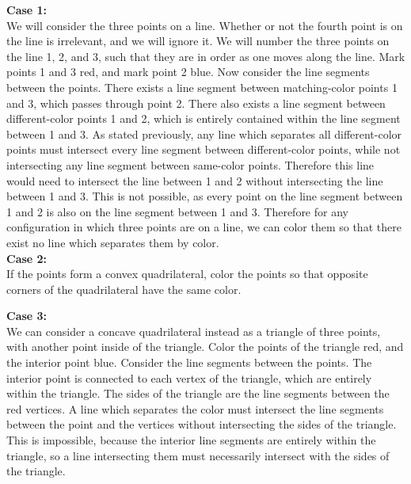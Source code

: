 \documentclass[11pt]{article}
\begin{document}
\textbf{Case 1:} \\ 
We will consider the three points on a line. Whether or not the fourth point is on the line is irrelevant, and we will ignore it. We will number the three points on the line 1, 2, and 3, such that they are in order as one moves along the line. Mark points 1 and 3 red, and mark point 2 blue. Now consider the line segments between the points. There exists a line segment between matching-color points 1 and 3, which passes through point 2. There also exists a line segment between different-color points 1 and 2, which is entirely contained within the line segment between 1 and 3. As stated previously, any line which separates all different-color points must intersect every line segment between different-color points, while not intersecting any line segment between same-color points. Therefore this line would need to intersect the line between 1 and 2 without intersecting the line between 1 and 3. This is not possible, as every point on the line segment between 1 and 2 is also on the line segment between 1 and 3. Therefore for any configuration in which three points are on a line, we can color them so that there exist no line which separates them by color. \\ 

\textbf{Case 2:} \\ 
If the points form a convex quadrilateral, color the points so that opposite corners of the quadrilateral have the same color. 

\textbf{Case 3:} \\ 
We can consider a concave quadrilateral instead as a triangle of three points, with another point inside of the triangle. Color the points of the triangle red, and the interior point blue. Consider the line segments between the points. The interior point is connected to each vertex of the triangle, which are entirely within the triangle. The sides of the triangle are the line segments between the red vertices. A line which separates the color must intersect the line segments between the point and the vertices without intersecting the sides of the triangle. This is impossible, because the interior line segments are entirely within the triangle, so a line intersecting them must necessarily intersect with the sides of the triangle.
\end{document}
